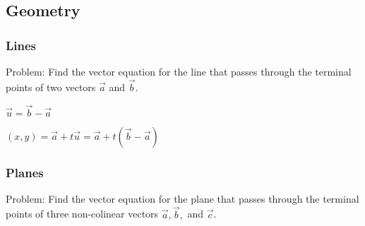 \documentclass[letterpaper,12pt,fleqn]{article}
\newcommand{\va}{\vec{a}}
\newcommand{\vb}{\vec{b}}
\newcommand{\vc}{\vec{c}}
\begin{document}
\newpage

\subsection*{Geometry}

\subsubsection*{Lines}

Problem: Find the vector equation for the line that passes through the terminal
points of two vectors $\va$ and $\vb$.

\bigskip

\begin{minipage}{3in}
\end{minipage}
\begin{minipage}{3in}
  $\vec{u}=\vec{b}-\vec{a}$

  \bigskip

  $(x,y)=\vec{a}+t\vec{u}=\vec{a}+t(\vec{b}-\vec{a})$
\end{minipage}

\bigskip

\subsubsection*{Planes}

Problem: Find the vector equation for the plane that passes through the terminal
points of three non-colinear vectors $\va,\vb,$ and $\vc$.

\bigskip
\end{document}
